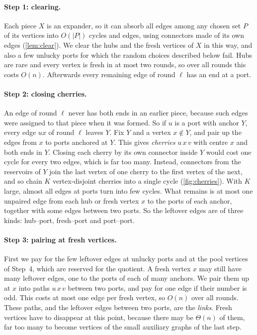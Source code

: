 \documentclass[11pt]{article}
\theoremstyle{definition}
\theoremstyle{remark}
\numberwithin{equation}{section}
\numberwithin{figure}{section}
\numberwithin{table}{section}
\begin{document}
\paragraph{Step 1: clearing.} Each piece $X$ is an expander, so it can absorb
all edges among any chosen set $P$ of its vertices into $O(|P|)$ cycles and
edges, using connectors made of its own edges (\cref{lem:clear}). We clear the
hubs and the fresh vertices of $X$ in this way, and also a few unlucky ports
for which the random choices described below fail. Hubs are rare and every vertex
is fresh in at most two rounds, so over all rounds this costs $O(n)$. Afterwards
every remaining edge of round $\ell$ has an end at a port.

\paragraph{Step 2: closing cherries.} An edge of round $\ell$ never has both
ends in an earlier piece, because such edges were assigned to that piece when it
was formed. So if $u$ is a port with anchor $Y$, every edge $ux$ of round $\ell$
leaves $Y$. Fix $Y$ and a vertex $x\notin Y$, and pair up the edges from $x$ to
ports anchored at $Y$. This gives \emph{cherries} $u\,x\,v$ with centre $x$ and
both ends in $Y$. Closing each cherry by its own connector inside $Y$ would cost
one cycle for every two edges, which is far too many. Instead, connectors from
the reservoirs of $Y$ join the last vertex of one cherry to the first vertex of
the next, and so chain $K$ vertex-disjoint cherries into a single cycle
(\cref{fig:cherries}). With $K$ large, almost all edges at ports turn into few
cycles. What remains is at most one unpaired edge from each hub or fresh
vertex $x$ to the ports of each anchor, together with some edges between two
ports. So the leftover edges are of three kinds: hub--port, fresh--port and
port--port.

\paragraph{Step 3: pairing at fresh vertices.} First we pay for the few leftover
edges at unlucky ports and at the pool vertices of Step~4, which are reserved
for the quotient. A fresh vertex $x$ may still have
many leftover edges, one to the ports of each of many anchors. We pair them up
at $x$ into paths $u\,x\,v$ between two ports, and pay for one edge if their
number is odd. This costs at most one edge per fresh vertex, so $O(n)$ over all
rounds. These paths, and the leftover edges between two ports, are the
\emph{links}. Fresh vertices have to disappear at this point, because there may
be $\Theta(n)$ of them, far too many to become vertices of the small auxiliary
graphs of the last step.
\end{document}
